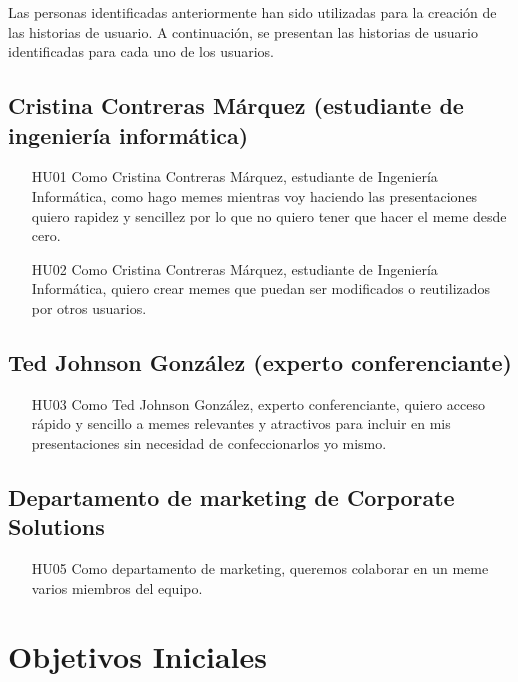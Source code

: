     Las personas identificadas anteriormente han sido utilizadas para la creación de las historias de usuario. A continuación, se presentan las historias de usuario identificadas para cada uno de los usuarios.

    \subsection{Cristina Contreras Márquez (estudiante de ingeniería informática)}

        \begin{enumerate}
            \item [HU01] Como Cristina Contreras Márquez, estudiante de Ingeniería Informática, como hago memes mientras voy haciendo las presentaciones quiero rapidez y sencillez por lo que no quiero tener que hacer el meme desde cero.
            \item [HU02] Como Cristina Contreras Márquez, estudiante de Ingeniería Informática, quiero crear memes que puedan ser modificados o reutilizados por otros usuarios.
        \end{enumerate}

    \subsection{Ted Johnson González (experto conferenciante)}

        \begin{enumerate}
            \item [HU03] Como Ted Johnson González, experto conferenciante, quiero acceso rápido y sencillo a memes relevantes y atractivos para incluir en mis presentaciones sin necesidad de confeccionarlos yo mismo.
        \end{enumerate}

    \subsection{Departamento de marketing de Corporate Solutions}

        \begin{enumerate}
            \item [HU05] Como departamento de marketing, queremos colaborar en un meme varios miembros del equipo.
        \end{enumerate}

\section{Objetivos Iniciales}~\label{sec:objetivos_iniciales}

